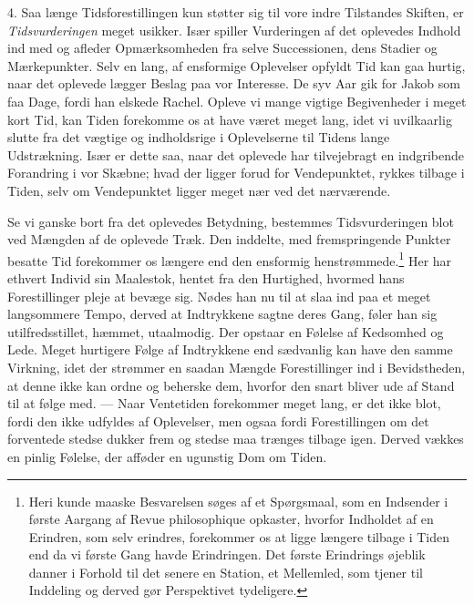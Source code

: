 \documentclass[12pt,a4paper,openany]{book}
\newcommand{\opage}[1]{\marginnote{\footnotesize\textit{[#1]}}}
\begin{document}
4. Saa længe Tidsforestillingen kun støtter sig til vore indre
Tilstandes Skiften, er \emph{Tidsvurderingen} meget usikker. Især
spiller Vurderingen af det oplevedes Indhold ind med og afleder
Opmærksomheden fra selve Successionen, dens Stadier og Mærkepunkter.
Selv en lang, af ensformige Oplevelser opfyldt Tid kan gaa hurtig, naar
det oplevede lægger Beslag paa vor Interesse. De syv Aar gik for Jakob
som faa Dage, fordi han elskede Rachel. Opleve vi mange vigtige
Begivenheder i meget kort Tid, kan Tiden forekomme os at have været
meget lang, idet vi uvilkaarlig slutte fra det vægtige og indholdsrige i
Oplevelserne til Tidens lange Udstrækning. Især er dette saa, naar det
oplevede har tilvejebragt en indgribende Forandring i vor Skæbne; hvad
der ligger forud for Vendepunktet, rykkes tilbage i Tiden, selv om
Vendepunktet ligger meget nær ved det nærværende.

Se vi ganske bort fra det oplevedes Betydning, bestemmes Tidsvurderingen
blot ved Mængden af de oplevede Træk. Den inddelte, med fremspringende
Punkter besatte Tid forekommer
\opage{232}os længere end den ensformig henstrømmede.\footnote[1]{Heri
kunde maaske Besvarelsen søges af et Spørgsmaal, som en Indsender i
første Aargang af Revue philosophique opkaster, hvorfor Indholdet af en
Erindren, som selv erindres, forekommer os at ligge længere tilbage i
Tiden end da vi første Gang havde Erindringen. Det første Erindrings
øjeblik danner i Forhold til det senere en Station, et Mellemled, som
tjener til Inddeling og derved gør Perspektivet tydeligere.} Her har
ethvert Individ sin Maalestok, hentet fra den Hurtighed, hvormed hans
Forestillinger pleje at bevæge sig. Nødes han nu til at slaa ind paa et
meget langsommere Tempo, derved at Indtrykkene sagtne deres Gang, føler
han sig utilfredsstillet, hæmmet, utaalmodig. Der opstaar en Følelse af
Kedsomhed og Lede. Meget hurtigere Følge af Indtrykkene end sædvanlig
kan have den samme Virkning, idet der strømmer en saadan Mængde
Forestillinger ind i Bevidstheden, at denne ikke kan ordne og beherske
dem, hvorfor den snart bliver ude af Stand til at følge med. --- Naar
Ventetiden forekommer meget lang, er det ikke blot, fordi den ikke
udfyldes af Oplevelser, men ogsaa fordi Forestillingen om det forventede
stedse dukker frem og stedse maa trænges tilbage igen. Derved vækkes en
pinlig Følelse, der afføder en ugunstig Dom om Tiden.
\end{document}
